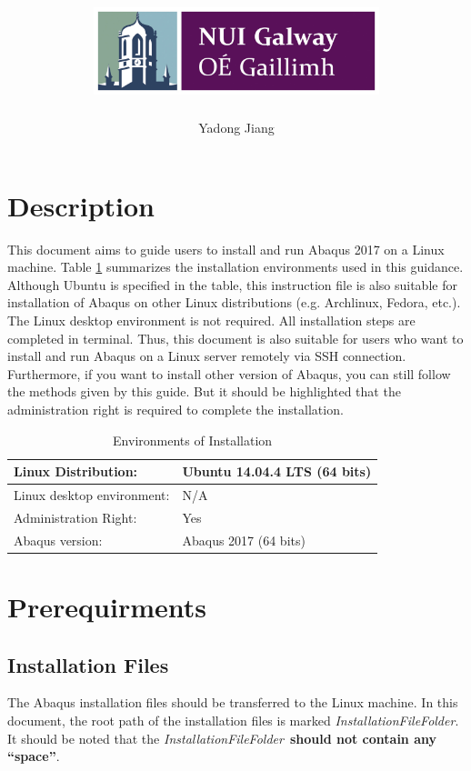 \documentclass[12pt]{article}
\title{\includegraphics[height=1in]{Figures/NUIG_Logo.jpg}\\ \tit}
\author[1]{Yadong Jiang}
\affil[1]{College of Engineering and Informatics, National University of Ireland Galway}
\date{}
\newcommand{\ifp}{\textit{InstallationFileFolder}}
\begin{document}
\maketitle

\newpage

\section*{Description}
This document aims to guide users to install and run Abaqus 2017 on a Linux machine. Table \ref{tb-1} summarizes the installation environments used in this guidance. Although Ubuntu is specified in the table, this instruction file is also suitable for installation of Abaqus on other Linux distributions (e.g. Archlinux, Fedora, etc.). The Linux desktop environment is not required. All installation steps are completed in terminal. Thus, this document is also suitable for users who want to install and run Abaqus on a Linux server remotely via SSH connection. Furthermore, if you want to install other version of Abaqus, you can still follow the methods given by this guide. But it should be highlighted that the administration right is required to complete the installation.

\begin{table}[h!]
\caption{Environments of Installation}
\begin{center}
\begin{tabular}{l l}
    \hline
    Linux Distribution: & Ubuntu 14.04.4 LTS (64 bits)\\
    \hline
    Linux desktop environment: & N/A \\
    \hline
    Administration Right: & Yes \\
    \hline
    Abaqus version: & Abaqus 2017 (64 bits) \\
    \hline
\end{tabular}
\end{center}
\label{tb-1}
\end{table}

\section*{Prerequirments}
\subsection*{Installation Files}
The Abaqus installation files should be transferred to the Linux machine. In this document, the root path of the installation files is marked \ifp. It should be noted that the \ifp\ \textbf{should not contain any ``space''}.
\end{document}
